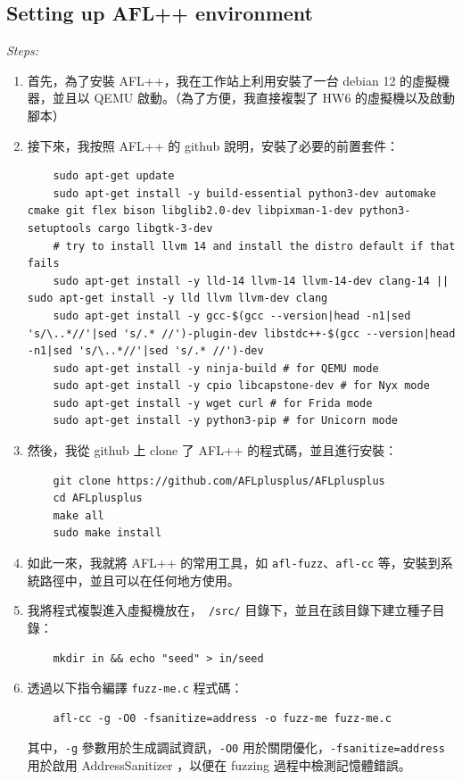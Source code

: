 \documentclass[12pt]{article}
\begin{document}
\subsection{Setting up AFL++ environment}
\textit{Steps:}
\begin{enumerate}
  \item 首先，為了安裝 AFL++，我在工作站上利用安裝了一台 debian 12 的虛擬機器，並且以 QEMU 啟動。（為了方便，我直接複製了 HW6 的虛擬機以及啟動腳本）
  \item 接下來，我按照 AFL++ 的 github 說明，安裝了必要的前置套件：
  \begin{verbatim}
    sudo apt-get update
    sudo apt-get install -y build-essential python3-dev automake cmake git flex bison libglib2.0-dev libpixman-1-dev python3-setuptools cargo libgtk-3-dev
    # try to install llvm 14 and install the distro default if that fails
    sudo apt-get install -y lld-14 llvm-14 llvm-14-dev clang-14 || sudo apt-get install -y lld llvm llvm-dev clang
    sudo apt-get install -y gcc-$(gcc --version|head -n1|sed 's/\..*//'|sed 's/.* //')-plugin-dev libstdc++-$(gcc --version|head -n1|sed 's/\..*//'|sed 's/.* //')-dev
    sudo apt-get install -y ninja-build # for QEMU mode
    sudo apt-get install -y cpio libcapstone-dev # for Nyx mode
    sudo apt-get install -y wget curl # for Frida mode
    sudo apt-get install -y python3-pip # for Unicorn mode
  \end{verbatim}
  \item 然後，我從 github 上 clone 了 AFL++ 的程式碼，並且進行安裝：
  \begin{verbatim}
    git clone https://github.com/AFLplusplus/AFLplusplus
    cd AFLplusplus
    make all
    sudo make install
  \end{verbatim}
  \item 如此一來，我就將 AFL++ 的常用工具，如 \texttt{afl-fuzz}、\texttt{afl-cc} 等，安裝到系統路徑中，並且可以在任何地方使用。
  \item 我將程式複製進入虛擬機放在，\texttt{~/src/} 目錄下，並且在該目錄下建立種子目錄：
  \begin{verbatim}
    mkdir in && echo "seed" > in/seed
  \end{verbatim}
  \item 透過以下指令編譯 \texttt{fuzz-me.c} 程式碼：
  \begin{verbatim}
    afl-cc -g -O0 -fsanitize=address -o fuzz-me fuzz-me.c
  \end{verbatim}
  其中，\texttt{-g} 參數用於生成調試資訊，\texttt{-O0} 用於關閉優化，\texttt{-fsanitize=address} 用於啟用 AddressSanitizer ，以便在 fuzzing 過程中檢測記憶體錯誤。

\end{enumerate}
\end{document}
